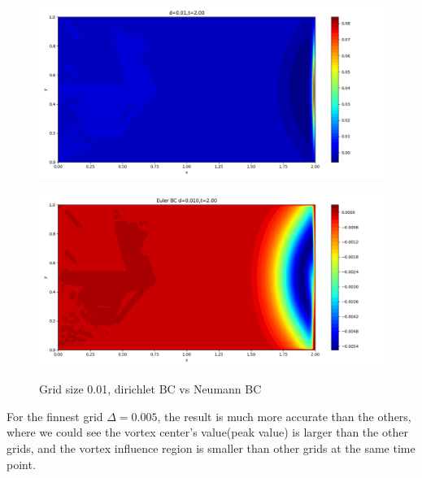 \documentclass[12pt]{article}
\begin{document}
\begin{figure}[H]
\begin{minipage}{\linewidth}
\begin{minipage}{0.5\textwidth}
\includegraphics[width=\linewidth]{figures/3d0.01t2.00.png}
\label{fig9}
\end{minipage}\hfill
\begin{minipage}{0.5\textwidth}
\includegraphics[width=\linewidth]{figures/3Ed0.010t2.00.png}
\label{fig10}
\end{minipage}
\caption{Grid size 0.01, dirichlet BC vs Neumann BC}

\end{minipage}
\end{figure}

For the finnest grid $\Delta = 0.005$, the result is much more 
accurate than the others, where we could see the vortex 
center's value(peak value) is larger than the other grids, and
the vortex influence region is smaller than other grids at the 
same time point.
\end{document}
